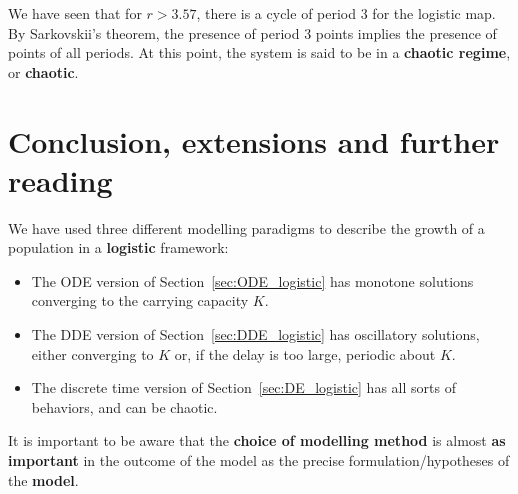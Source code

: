 We have seen that for $r>3.57$, there is a cycle of period 3 for the logistic map. By Sarkovskii's theorem, the presence of period 3 points implies the presence of points of all periods.
At this point, the system is said to be in a \textbf{chaotic regime}, or \textbf{chaotic}.




\section{Conclusion, extensions and further reading}

We have used three different modelling paradigms to describe the growth of a population in a \textbf{logistic} framework:
\begin{itemize}
\item The ODE version of Section~\ref{sec:ODE_logistic} has monotone solutions converging to the carrying capacity $K$.
\item The DDE version of Section~\ref{sec:DDE_logistic} has oscillatory solutions, either converging to $K$ or, if the delay is too large, periodic about $K$.
\item The discrete time version of Section~\ref{sec:DE_logistic} has all sorts of behaviors, and can be chaotic.
\end{itemize}
It is important to be aware that the {\bf choice of modelling method} is almost {\bf as important} in the outcome of the model as the precise formulation/hypotheses of the {\bf model}.


%
%
%
%
%
%

